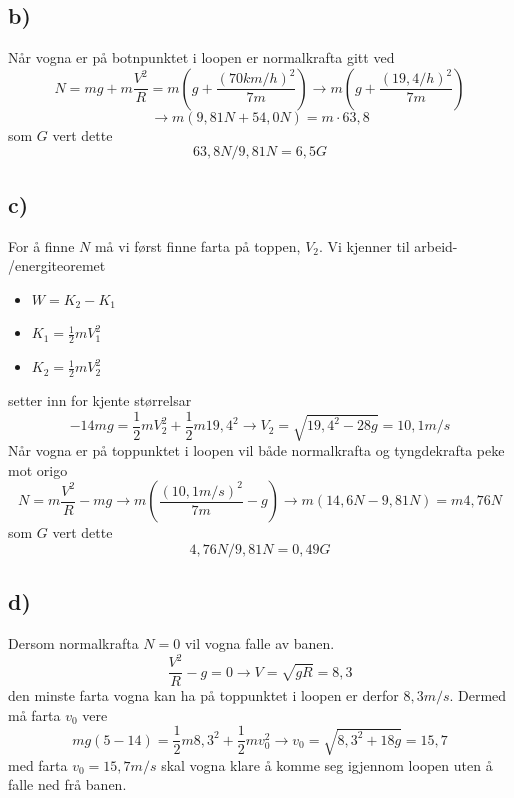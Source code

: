 \documentclass[12pt,a4paper]{article}
\begin{document}
    \subsection*{b)}
    Når vogna er på botnpunktet i loopen er normalkrafta gitt ved
    \begin{equation}
      N = mg + m\frac{V^2}{R} = m \left( g + \frac{(70km/h)^2}{7m} \right)
      \rightarrow m \left( g + \frac{(19,4/h)^2}{7m} \right)
    \end{equation}
    \begin{equation}
      \rightarrow m(9,81N + 54,0N) = m\cdot 63,8
    \end{equation}
    som $G$ vert dette
    \begin{equation}
      63,8N/9,81N = 6,5G
    \end{equation}

    \subsection*{c)}
    For å finne $N$ må vi først finne farta på toppen, $V_2$. Vi kjenner til arbeid-
    /energiteoremet
    \begin{itemize}
      \item $W = K_2 - K_1$
      \item $K_1 = \frac{1}{2}mV_1^2$
      \item $K_2 = \frac{1}{2}mV_2^2$
    \end{itemize}
    setter inn for kjente størrelsar
    \begin{equation}
      -14mg = \frac{1}{2}mV_2^2 + \frac{1}{2}m19,4^2 \rightarrow
      V_2 = \sqrt{19,4^2 - 28g} = 10,1 m/s
    \end{equation}
    Når vogna er på toppunktet i loopen vil både normalkrafta og tyngdekrafta peke mot origo
    \begin{equation}
      N = m\frac{V^2}{R} - mg \rightarrow m \left( \frac{(10,1m/s)^2}{7m} - g \right)
      \rightarrow m(14,6N - 9,81N) = m4,76N
    \end{equation}
    som $G$ vert dette
    \begin{equation}
      4,76N/9,81N = 0,49G
    \end{equation}

    \subsection*{d)}
    Dersom normalkrafta $N=0$ vil vogna falle av banen.
    \begin{equation}
      \frac{V^2}{R} - g = 0 \rightarrow V = \sqrt{gR} = 8,3
    \end{equation}
    den minste farta vogna kan ha på toppunktet i loopen er derfor $8,3m/s$. Dermed må
    farta $v_0$ vere 
    \begin{equation}
      mg(5 - 14) = \frac{1}{2}m8,3^2 + \frac{1}{2}mv_0^2 \rightarrow
      v_0 = \sqrt{8,3^2 + 18g} = 15,7
    \end{equation}
    med farta $v_0 = 15,7 m/s$ skal vogna klare å komme seg igjennom loopen uten
    å falle ned frå banen.
\end{document}
